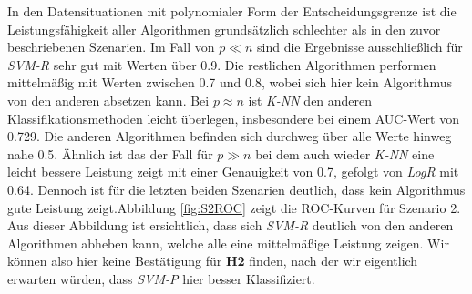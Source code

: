 \documentclass[
]{article}
\begin{document}
In den Datensituationen mit polynomialer Form der Entscheidungsgrenze
ist die Leistungsfähigkeit aller Algorithmen grundsätzlich schlechter
als in den zuvor beschriebenen Szenarien. Im Fall von \(p \ll n\) sind
die Ergebnisse ausschließlich für \textit{SVM-R} sehr gut mit Werten
über 0.9. Die restlichen Algorithmen performen mittelmäßig mit Werten
zwischen 0.7 und 0.8, wobei sich hier kein Algorithmus von den anderen
absetzen kann. Bei \(p \approx n\) ist \textit{K-NN} den anderen
Klassifikationsmethoden leicht überlegen, insbesondere bei einem
AUC-Wert von 0.729. Die anderen Algorithmen befinden sich durchweg über
alle Werte hinweg nahe 0.5. Ähnlich ist das der Fall für \(p \gg n\) bei
dem auch wieder \textit{K-NN} eine leicht bessere Leistung zeigt mit
einer Genauigkeit von 0.7, gefolgt von \textit{LogR} mit 0.64. Dennoch
ist für die letzten beiden Szenarien deutlich, dass kein Algorithmus
gute Leistung zeigt.\newline Abbildung \ref{fig:S2ROC} zeigt die
ROC-Kurven für Szenario 2. Aus dieser Abbildung ist ersichtlich, dass
sich \textit{SVM-R} deutlich von den anderen Algorithmen abheben kann,
welche alle eine mittelmäßige Leistung zeigen. Wir können also hier
keine Bestätigung für \textbf{H2} finden, nach der wir eigentlich
erwarten würden, dass \textit{SVM-P} hier besser Klassifiziert.
\end{document}
